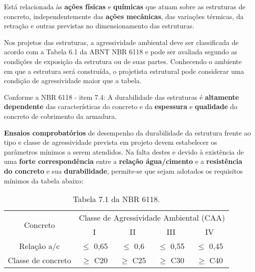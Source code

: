Está relacionada às \textbf{ações físicas} e \textbf{químicas} que atuam sobre as estruturas de concreto, independentemente das \textbf{ações mecânicas}, das variações térmicas, da retração e outras previstas no dimensionamento das estruturas.

Nos projetos das estruturas, a agressividade ambiental deve ser classificada de acordo com a Tabela 6.1 da ABNT NBR 6118 e pode ser avaliada segundo as condições de exposição da estrutura ou de suas partes. Conhecendo o ambiente em que a estrutura será construída, o projetista estrutural pode considerar uma condição de agressividade maior que a tabela.


Conforme a NBR 6118 - item 7.4: A durabilidade das estruturas é \textbf{altamente dependente} das características do concreto e da \textbf{espessura} e \textbf{qualidade} do concreto de cobrimento da armadura.

\textbf{Ensaios comprobatórios} de desempenho da durabilidade da estrutura frente ao tipo e classe de agressividade prevista em projeto devem estabelecer os parâmetros mínimos a serem atendidos. Na falta destes e devido à existência de uma \textbf{forte correspondência} entre a \textbf{relação água/cimento} e a \textbf{resistência do concreto} e sua \textbf{durabilidade}, permite-se que sejam adotados os requisitos mínimos da tabela abaixo:

\begin{table}[H]
\centering
\caption{Tabela 7.1 da NBR 6118.}
\begin{tabular}{|c|c|c|c|c|}
\hline
\multirow{2}{*}{Concreto} & \multicolumn{4}{c|}{Classe de Agressividade Ambiental (CAA)}                      \\ \cline{2-5} 
                          		& I                  & II                 & III                & IV                 \\ \hline
Relação a/c               & $\leqslant$ 0,65   & $\leqslant$ 0,6    & $\leqslant$ 0,55   & $\leqslant$ 0,45   \\ \hline
Classe de concreto        & $\geqslant$ C20 & $\geqslant$ C25 & $\geqslant$ C30 & $\geqslant$ C40 \\ \hline
\end{tabular}
\end{table}